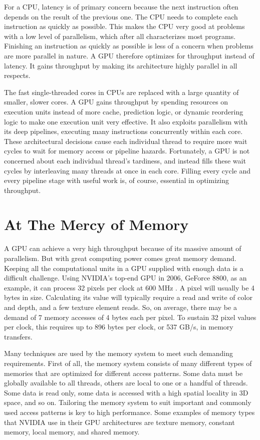 \documentclass[../main/report.tex]{subfiles}
\begin{document}
For a CPU, latency is of primary concern because the next instruction often depends on the result of the previous one.
The CPU needs to complete each instruction as quickly as possible.
This makes the CPU very good at problems with a low level of parallelism, which after all characterizes most programs.
Finishing an instruction as quickly as possible is less of a concern when problems are more parallel in nature.
A GPU therefore optimizes for throughput instead of latency.
It gains throughput by making its architecture highly parallel in all respects.

The fast single-threaded cores in CPUs are replaced with a large quantity of smaller, slower cores.
A GPU gains throughput by spending resources on execution units instead of more cache, prediction logic, or dynamic reordering logic to make one execution unit very effective.
It also exploits parallelism with its deep pipelines, executing many instructions concurrently within each core.
These architectural decisions cause each individual thread to require more wait cycles to wait for memory access or pipeline hazards.
Fortunately, a GPU is not concerned about each individual thread's tardiness, and instead fills these wait cycles by interleaving many threads at once in each core.
Filling every cycle and every pipeline stage with useful work is, of course, essential in optimizing throughput.


\section{At The Mercy of Memory}

A GPU can achieve a very high throughput because of its massive amount of parallelism.
But with great computing power comes great memory demand.
Keeping all the computational units in a GPU supplied with enough data is a difficult challenge.
Using NVIDIA's top-end GPU in 2006, GeForce 8800, as an example, it can process 32 pixels per clock at 600 MHz \cite{gpu_appendix}.
A pixel will usually be 4 bytes in size.
Calculating its value will typically require a read and write of color and depth, and a few texture element reads.
So, on average, there may be a demand of 7 memory accesses of 4 bytes each per pixel.
To sustain 32 pixel values per clock, this requires up to 896 bytes per clock, or 537 GB/s, in memory transfers.

Many techniques are used by the memory system to meet such demanding requirements.
First of all, the memory system consists of many different types of memories that are optimized for different access patterns.
Some data must be globally available to all threads, others are local to one or a handful of threads.
Some data is read only, some data is accessed with a high spatial locality in 3D space, and so on.
Tailoring the memory system to suit important and commonly used access patterns is key to high performance.
Some examples of memory types that NVIDIA use in their GPU architectures are texture memory, constant memory, local memory, and shared memory.
\end{document}
